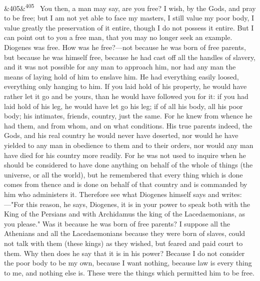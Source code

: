 \documentclass[12pt]{article}
\newcommand{\para}[1][]{\par\noindent\ifx&#1&\else\textsuperscript{\footnotesize #1}~\fi}
\begin{document}
\para[405] You then, a man may say, are you free? I wish, by the Gods, and pray to be free; but I am not yet able to face my masters, I still value my poor body, I value greatly the preservation of it entire, though I do not possess it entire. But I can point out to you a free man, that you may no longer seek an example. Diogenes was free. How was he free?—not because he was born of free parents, but because he was himself free, because he had cast off all the handles of slavery, and it was not possible for any man to approach him, nor had any man the means of laying hold of him to enslave him. He had everything easily loosed, everything only hanging to him. If you laid hold of his property, he would have rather let it go and be yours, than he would have followed you for it: if you had laid hold of his leg, he would have let go his leg; if of all his body, all his poor body; his intimates, friends, country, just the same. For he knew from whence he had them, and from whom, and on what conditions. His true parents indeed, the Gods, and his real country he would never have deserted, nor would he have yielded to any man in obedience to them and to their orders, nor would any man have died for his country more readily. For he was not used to inquire when he should be considered to have done anything on behalf of the whole of things (the universe, or all the world), but he remembered that every thing which is done comes from thence and is done on behalf of that country and is commanded by him who administers it. Therefore see what Diogenes himself says and writes:—"For this reason, he says, Diogenes, it is in your power to speak both with the King of the Persians and with Archidamus the king of the Lacedaemonians, as you please." Was it because he was born of free parents? I suppose all the Athenians and all the Lacedaemonians because they were born of slaves, could not talk with them (these kings) as they wished, but feared and paid court to them. Why then does he say that it is in his power? Because I do not consider the poor body to be my own, because I want nothing, because law is every thing to me, and nothing else is. These were the things which permitted him to be free.
\end{document}
